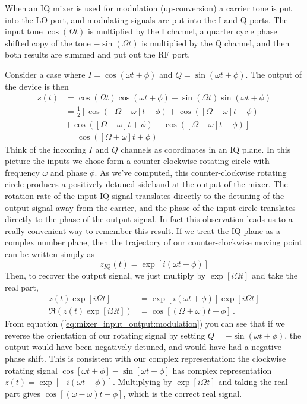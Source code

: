 

When an IQ mixer is used for modulation (up-conversion) a carrier tone is put into the LO port, and modulating signals are put into the I and Q ports. The input tone $\cos ( \Omega t)$ is multiplied by the I channel, a quarter cycle phase shifted copy of the tone $-\sin ( \Omega t)$ is multiplied by the Q channel, and then both results are summed and put out the RF port.

Consider a case where $I=\cos(\omega t + \phi)$ and $Q=\sin(\omega t + \phi)$. The output of the device is then
\begin{align}
s(t) &= \cos(\Omega t)\cos(\omega t + \phi) - \sin(\Omega t)\sin(\omega t + \phi) \nonumber \\
&= \frac{1}{2} \left[ \cos([\Omega + \omega]t + \phi) + \cos([\Omega-\omega]t - \phi) \right. \nonumber \\
&  \left. + \cos([\Omega+\omega]t + \phi) - \cos([\Omega-\omega]t-\phi) \right] \label{eq:mixer_input_output:modulation} \\
&= \cos([\Omega+\omega]t + \phi) \nonumber
\end{align}
Think of the incoming $I$ and $Q$ channels as coordinates in an IQ plane.
In this picture the inputs we chose form a counter-clockwise rotating circle with frequency $\omega$ and phase $\phi$.
As we've computed, this counter-clockwise rotating circle produces a positively detuned sideband at the output of the mixer.
The rotation rate of the input IQ signal translates directly to the detuning of the output signal away from the carrier, and the phase of the input circle translates directly to the phase of the output signal.
In fact this observation leads us to a really convenient way to remember this result.
If we treat the IQ plane as a complex number plane, then the trajectory of our counter-clockwise moving point can be written simply as \begin{equation}
z_{IQ}(t) = \exp[i(\omega t + \phi)] \label{eq:mixer_input_output:modulation_complex_rep} \end{equation}
Then, to recover the output signal, we just multiply by $\exp[i\Omega t]$ and take the real part,
\begin{align}
z(t)\exp[i\Omega t] &= \exp[i(\omega t + \phi)]\exp[i\Omega t] \nonumber \\
\Re \left( z(t)\exp[i\Omega t] \right ) &= \cos[(\Omega+\omega)t+\phi] \nonumber \, .
\end{align}
From equation (\ref{eq:mixer_input_output:modulation}) you can see that if we reverse the orientation of our rotating signal by setting $Q=-\sin(\omega t + \phi)$, the output would have been negatively detuned, and would have had a negative phase shift.
This is consistent with our complex representation: the clockwise rotating signal $\cos[\omega t + \phi] - \sin[\omega t + \phi]$ has complex representation $z(t) = \exp[-i(\omega t + \phi)]$.
Multiplying by $\exp[i\Omega t]$ and taking the real part gives $\cos[(\omega-\omega)t - \phi]$, which is the correct real signal.

